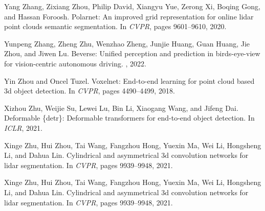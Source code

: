 \documentclass[10pt,twocolumn,letterpaper]{article}
\begin{document}
{\begin{thebibliography}{10}
Yang Zhang, Zixiang Zhou, Philip David, Xiangyu Yue, Zerong Xi, Boqing Gong,
  and Hassan Foroosh.
\newblock Polarnet: An improved grid representation for online lidar point
  clouds semantic segmentation.
\newblock In {\em CVPR}, pages 9601--9610, 2020.

Yunpeng Zhang, Zheng Zhu, Wenzhao Zheng, Junjie Huang, Guan Huang, Jie Zhou,
  and Jiwen Lu.
\newblock Beverse: Unified perception and prediction in birds-eye-view for
  vision-centric autonomous driving.
, 2022.

Yin Zhou and Oncel Tuzel.
\newblock Voxelnet: End-to-end learning for point cloud based 3d object
  detection.
\newblock In {\em CVPR}, pages 4490--4499, 2018.

Xizhou Zhu, Weijie Su, Lewei Lu, Bin Li, Xiaogang Wang, and Jifeng Dai.
\newblock Deformable {\{}detr{\}}: Deformable transformers for end-to-end
  object detection.
\newblock In {\em ICLR}, 2021.

Xinge Zhu, Hui Zhou, Tai Wang, Fangzhou Hong, Yuexin Ma, Wei Li, Hongsheng Li,
  and Dahua Lin.
\newblock Cylindrical and asymmetrical 3d convolution networks for lidar
  segmentation.
\newblock In {\em CVPR}, pages 9939--9948, 2021.

Xinge Zhu, Hui Zhou, Tai Wang, Fangzhou Hong, Yuexin Ma, Wei Li, Hongsheng Li,
  and Dahua Lin.
\newblock Cylindrical and asymmetrical 3d convolution networks for lidar
  segmentation.
\newblock In {\em CVPR}, pages 9939--9948, 2021.

\end{thebibliography}
 }
\end{document}
